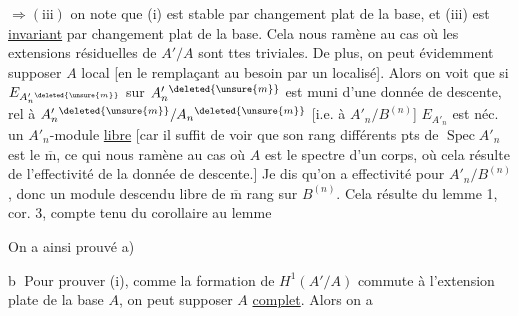  $\Rightarrow(\mathrm{iii})$ 
on note que (i) est stable par changement
plat de la base, et (iii) est \uline{invariant} par
changement  plat de la base. Cela nous ramène au
cas où les extensions résiduelles de $A'/A$ sont ttes
triviales.  De plus, on peut évidemment
supposer  $A$ local [en le remplaçant au besoin
par un localisé]. Alors on voit que si
$E_{A'_n{}^{\deleted{\unsure{m}}}}$  sur $A'_n{}^{\deleted{\unsure{m}}}$ est muni d'une donnée de
descente,  rel à $A'_n{}^{\deleted{\unsure{m}}}/A_n{}^{\deleted{\unsure{m}}}$
[i.e. à $A'_n/B^{(n)}$]
$E_{A'_n}$ est néc. un $A'_n$-module \uline{libre} [car il
suffit de voir que son rang  différents pts
de $\operatorname{Spec} A'_n$ est le $\overline{\mathrm m}$, ce qui nous ramène au
cas où $A$ est le spectre d'un corps, où cela
résulte de l'effectivité de la donnée de descente.]
Je dis qu'on a effectivité pour $A'_n/B^{(n)}$, donc
un module descendu libre de $\overline{\mathrm m}$ rang sur $B^{(n)}$.
Cela résulte du lemme 1, cor. 3, compte tenu
du corollaire au lemme 

On a ainsi prouvé a)

\textcircled{b} Pour prouver (i), comme la formation de
$H^1(A'/A)$ commute à l'extension plate de la base
$A$, on peut supposer $A$ \uline{complet}. Alors  on a
